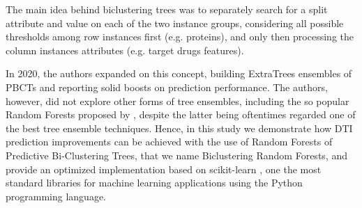 \documentclass[conference]{IEEEtran}
\begin{document}
The main idea behind biclustering trees was to separately search for a split
attribute and value on each of the two instance groups, considering all possible
thresholds among row instances first (e.g. proteins), and only then processing
the column instances attributes (e.g. target drugs features).  \par In 2020, the
authors expanded on this concept, building ExtraTrees ensembles of PBCTs
\cite{Pliakos_2020} and reporting solid boosts on prediction performance. The
authors, however, did not explore other forms of tree ensembles, including the
so popular Random Forests proposed by \cite{Breiman_2001}, despite the latter
being oftentimes regarded one of the best tree ensemble
techniques\cite{Huang_2021, Amasyali_2011, Hall_2003, Banfield_2007}. Hence, in
this study we demonstrate how DTI prediction improvements can be achieved with
the use of Random Forests of Predictive Bi-Clustering Trees, that we name
Biclustering Random Forests, and provide an optimized implementation based on
scikit-learn \cite{scikit-learn}, one the most standard libraries for machine
learning applications using the Python\cite{python} programming language.





\end{document}
